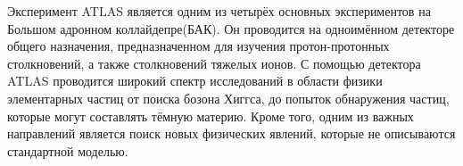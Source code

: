 Эксперимент ATLAS является одним из четырёх основных экспериментов на Большом адронном коллайдепре(БАК). Он проводится на одноимённом детекторе общего назначения, предназначенном для изучения протон-протонных столкновений, а также столкновений тяжелых ионов. С помощью детектора ATLAS проводится широкий спектр исследований в области физики элементарных частиц от поиска бозона Хиггса, до попыток обнаружения частиц, которые могут составлять тёмную материю. Кроме того, одним из важных направлений является поиск новых физических явлений, которые не описываются стандартной моделью.
